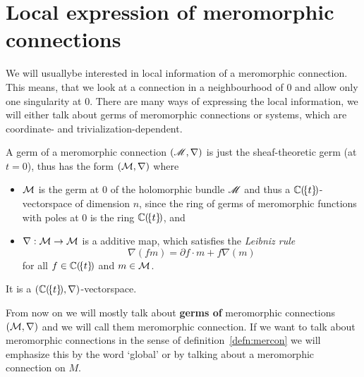 \section{Local expression of meromorphic connections}
\begin{comment}
  \cite[28]{sabbah2007isomonodromic}, \cite[2]{thboalch} and
  \cite[11]{babbitt1989local}
\end{comment}
We will usually\TODO[only?] be interested in local information of a meromorphic
connection.  This means, that we look at a connection in a neighbourhood of $0$
and allow only one singularity at $0$.
There are many ways of expressing the local information, we will either talk
about germs of meromorphic connections or systems, which are coordinate-
and trivialization-dependent.
\begin{prop}
  A germ of a meromorphic connection $(\mathscr{M},\nabla)$ is just the sheaf-theoretic
  germ (at $t=0$), thus has the form $(\mathcal{M},\nabla)$ where
  \begin{itemize}
    \item $\mathcal{M}$ is the germ at $0$ of the holomorphic bundle $\mathscr{M}$ and thus a
      $\mathbb{C}(\!\{t\}\!)$-vectorspace of dimension $n$, since the ring of germs of
      meromorphic functions with poles at $0$ is the ring $\mathbb{C}(\!\{t\}\!)$, and
    \item $\nabla:\mathcal{M}\to \mathcal{M}$  is a additive map, which
      satisfies the \emph{Leibniz rule}
      \[
        \nabla(fm)=\partial f\cdot m + f\nabla(m)
      \]
      for all $f\in\mathbb{C}(\!\{t\}\!)$ and $m\in \mathcal{M}$.
  \end{itemize}
  \begin{s-rem}
    It is a $(\mathbb{C}(\!\{t\}\!),\nabla)$-vectorspace.
  \end{s-rem}
  \begin{comment}
    \begin{s-rem}
      Loday-Richaud calls this in \cite[Def.4.2.1]{Loday2014} a
      \emph{differential module}.
    \end{s-rem}
  \end{comment}
\end{prop}
\begin{rem}
  From now on we will mostly talk about \textbf{germs of} meromorphic
  connections $(\mathcal{M},\nabla)$ and we will call them meromorphic connection. If
  we want to talk about meromorphic connections in the sense of
  definition~\ref{defn:mercon} we will emphasize this by the word `global' or
  by talking about a meromorphic connection on $M$.
\end{rem}
